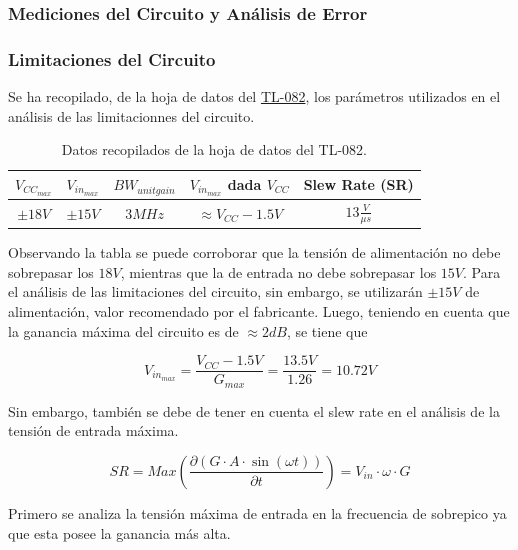 \subsubsection{Mediciones del Circuito y Análisis de Error}
\subsubsection{Limitaciones del Circuito}
\label{sec:limitaciones}


Se ha recopilado, de la hoja de datos del \href{http://www.ti.com/lit/ds/symlink/tl082.pdf}{TL-082}, los parámetros utilizados en el análisis de las limitacionnes del circuito.

\begin{table}[H]
\centering
\begin{tabular}{@{}ccccc@{}}
\toprule
$V_{CC_{max}}$ & $V_{in_{max}}$ & $BW_{unitgain}$ & $V_{in_{max}}$ dada $V_{CC}$ & Slew Rate (SR)\\ \midrule
$\pm 18V$ & $\pm 15V$ & $3MHz$ & $\approx V_{CC}-1.5V$ & $13\frac{V}{\mu s}$\\ \bottomrule
\end{tabular}
\caption{Datos recopilados de la hoja de datos del TL-082.}
\label{tab:datos_tl082}
\end{table}

Observando la tabla se puede corroborar que la tensión de alimentación no debe sobrepasar los $18V$, mientras que la de entrada no debe sobrepasar los $15V$. Para el análisis de las limitaciones del circuito, sin embargo, se utilizarán $\pm 15V$ de alimentación, valor recomendado por el fabricante.
Luego, teniendo en cuenta que la ganancia máxima del circuito es de $\approx 2dB$, se tiene que

\begin{equation}
	V_{in_{max}} = \frac{V_{CC} - 1.5V}{G_{max}} = \frac{13.5V}{1.26} = 10.72V
\end{equation}

Sin embargo, también se debe de tener en cuenta el slew rate en el análisis de la tensión de entrada máxima.

\begin{equation}
	SR= Max\left( \frac{\partial (G\cdot A\cdot \sin (\omega t))}{\partial t}\right) = V_{in} \cdot \omega \cdot G  
\end{equation}

Primero se analiza la tensión máxima de entrada en la frecuencia de sobrepico ya que esta posee la ganancia más alta.

